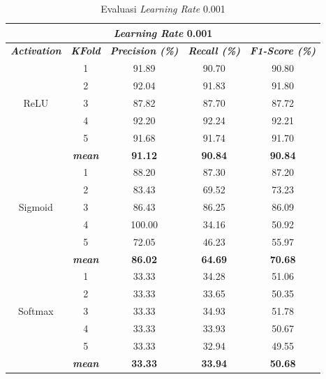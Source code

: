     \begin{table}[H]
        \centering
        \caption{Evaluasi \textit{Learning Rate} 0.001 }
        \begin{tabular}{ccccc}
            \toprule
            \multicolumn{5}{c}{\textit{Learning Rate} 0.001} \\ \hline
            
            \textbf{\textit{Activation}} & \multicolumn{1}{c}{\textbf{\textit{KFold}}} & \textbf{\textit{Precision (\%)} } & \textbf{\textit{Recall (\%)}} & \textbf{\textit{F1-Score (\%)}}  \\
    
            \midrule
            \multirow{5}{*}{ReLU} 

            & 1 & 91.89 & 90.70 & 90.80  \\
            & 2 & 92.04 & 91.83 & 91.80 \\
            & 3 & 87.82 & 87.70 & 87.72\\
            & 4 & 92.20 & 92.24 & 92.21\\
            & 5 & 91.68 & 91.74 & 91.70 \\
            & \textit{\textbf{mean }} & \textbf{91.12} & \textbf{90.84} & \textbf{90.84 }\\ \hline

            
            \multirow{5}{*}{Sigmoid}
            & 1 & 88.20 & 87.30 & 87.20  \\
            & 2 & 83.43 & 69.52 & 73.23 \\
            & 3 & 86.43 & 86.25 & 86.09 \\
            & 4 & 100.00 & 34.16 & 50.92 \\
            & 5 & 72.05 & 46.23 & 55.97 \\
            & \textit{\textbf{mean}}& \textbf{86.02} & \textbf{64.69} &\textbf{70.68} \\ 
                        \hline
    
            \multirow{5}{*}{Softmax}
            & 1 & 33.33  & 34.28 & 51.06 \\
            & 2 & 33.33  & 33.65 & 50.35 \\
            & 3 & 33.33  & 34.93 & 51.78  \\
            & 4 & 33.33  & 33.93 & 50.67 \\
            & 5 & 33.33  & 32.94 & 49.55 \\
            & \textit{\textbf{mean}}& \textbf{33.33} & \textbf{33.94} &\textbf{50.68} \\ 
    

            \bottomrule
        \end{tabular}
        \label{Evaluasi Learning Rate 0.001 }
    \end{table} 

